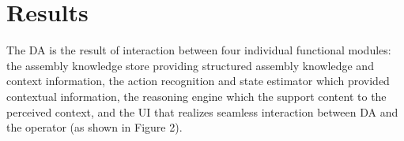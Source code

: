 \section{Results}\label{sec:Results}

The DA is the result of interaction between four individual functional modules: the assembly knowledge store providing structured assembly knowledge and context information, the action recognition and state estimator which provided contextual information, the reasoning engine which the support content to the perceived context, and the UI that realizes seamless interaction between DA and the operator (as shown in
Figure 2).





